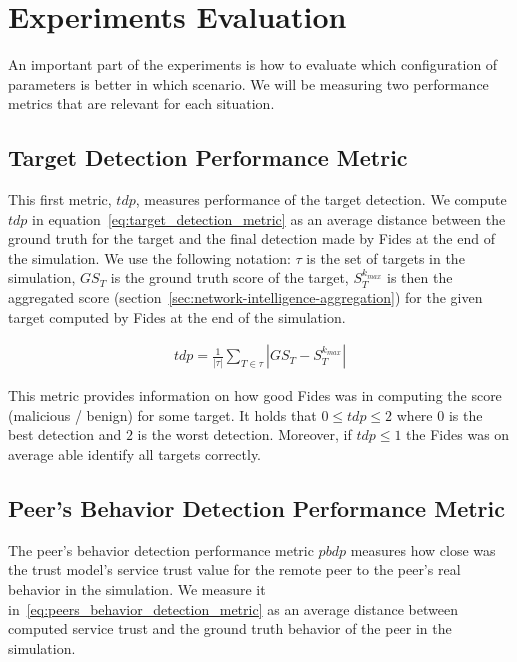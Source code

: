 \section{Experiments Evaluation}
\label{sec:experiments-evaluation}

An important part of the experiments is how to evaluate which configuration of parameters is better in which scenario. We will be measuring two performance metrics that are relevant for each situation.

\subsection{Target Detection Performance Metric}
\label{subsec:target-detection-performance-metric}
This first metric, $tdp$, measures performance of the target detection.
We compute $tdp$ in equation~\ref{eq:target_detection_metric} as an average distance between the ground truth for the target and the final detection made by Fides at the end of the simulation.
We use the following notation: $\tau$ is the set of targets in the simulation, $GS_{T}$ is the ground truth score of the target, $S^{k_{max}}_{T}$ is then the aggregated score (section~\ref{sec:network-intelligence-aggregation}) for the given target computed by Fides at the end of the simulation.

\begin{equation}
\begin{split}
    tdp = \frac{1}{|\tau|} \sum_{T \in \tau}\left|GS_{T} - S^{k_{max}}_{T} \right|
\end{split}
\label{eq:target_detection_metric}
\end{equation}

\noindent
This metric provides information on how good Fides was in computing the score (malicious / benign) for some target.
It holds that $0 \leq tdp \leq 2$ where $0$ is the best detection and $2$ is the worst detection.
Moreover, if $tdp \le 1$ the Fides was on average able identify all targets correctly.

\subsection{Peer's Behavior Detection Performance Metric}
\label{subsec:peers-behavior-detection-performance-metric}

The peer's behavior detection performance metric $pbdp$ measures how close was the trust model's service trust value for the remote peer to the peer's real behavior in the simulation.
We measure it in~\ref{eq:peers_behavior_detection_metric} as an average distance between computed service trust and the ground truth behavior of the peer in the simulation.

